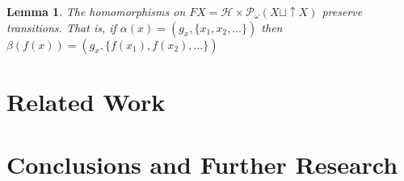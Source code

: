 \documentclass[12pt]{article}
\newtheorem{lemma}[theorem]{Lemma}
\theoremstyle{definition}
\newcommand{\1}{\mathbbm{1}}
\renewcommand{\H}{\mathcal{H}}
\newcommand{\finP}{\mathcal{P}_{\omega}}
\begin{document}
\begin{lemma}
    The homomorphisms on $FX = \H \times \finP(X \sqcup \uparrow X)$ preserve transitions. That is, if $\alpha (x) = (g_x, \{x_1, x_2, \dots\})$ then $\beta(f(x)) = (g_x, \{f(x_1), f(x_2), \dots\})$
\end{lemma}

\newpage
\section{Related Work}\label{relatedwork}

\section{Conclusions and Further Research}\label{conclusions}





\end{document}
